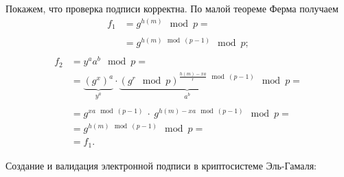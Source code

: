 Покажем, что проверка подписи корректна. По малой теореме Ферма получаем
\[ \begin{array}{ll}
    f_1 & = g^{h(m)} \mod p = \\
    & \\
    & = g^{h(m) \mod (p-1)} \mod p; \\
\end{array} \] \[ \begin{array}{ll}
    f_2 & = y^a a^b \mod p = \\
    & = \underbrace{\left( g^x \right)^a}_{y^a} \cdot
        \underbrace{\left( g^r \mod p \right)^{\frac{h(m) - xa}{r} \mod (p-1)}}_{a^b} \mod p = \\
    & \\
    & = g^{xa \mod (p-1)} ~\cdot~ g^{h(m) - xa \mod (p-1)} \mod p = \\
    & = g^{h(m) \mod (p-1)} \mod p = \\
    & = f_1.
\end{array} \]

\example Создание и валидация электронной подписи в криптосистеме Эль-Гамаля:


